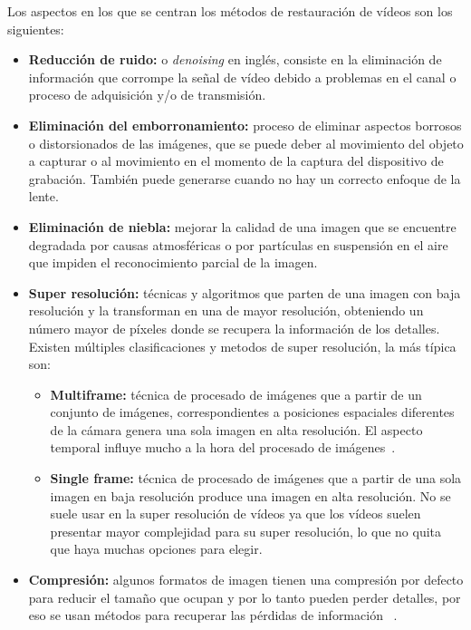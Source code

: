  Los aspectos en los que se centran los métodos de restauración de vídeos son los siguientes:
 \begin{itemize}

    \item \textbf{Reducción de ruido:} o \emph{denoising} en inglés, consiste en la eliminación de información que corrompe la señal de vídeo debido a problemas en el canal o proceso de adquisición y/o de transmisión.
        
    \item \textbf{Eliminación del emborronamiento:} proceso de eliminar aspectos borrosos o distorsionados de las imágenes, que se puede deber al movimiento del objeto a capturar o al movimiento en el momento de la captura del dispositivo de grabación. También puede generarse cuando no hay un correcto enfoque de la lente.
    
    \item \textbf{Eliminación de niebla:} mejorar la calidad de una imagen que se encuentre degradada por causas atmosféricas o por partículas en suspensión en el aire que impiden el reconocimiento parcial de la imagen. ~\cite{inproceedings}

    \item \textbf{Super resolución:} técnicas y algoritmos que parten de una imagen con baja resolución y la transforman en una de mayor resolución, obteniendo un número mayor de píxeles donde se recupera la información de los detalles. Existen múltiples clasificaciones y metodos de super resolución, la más típica son:
        \begin{itemize}
           \item \textbf{Multiframe:} técnica de procesado de imágenes que a partir de un conjunto de imágenes, correspondientes a posiciones espaciales diferentes de la cámara genera una sola imagen en alta resolución. El aspecto temporal influye mucho a la hora del procesado de imágenes~\cite{7919264}.
           
            \item \textbf{Single frame:} técnica de procesado de imágenes que a partir de una sola imagen en baja resolución produce una imagen en alta resolución. No se suele usar en la super resolución de vídeos ya que los vídeos suelen presentar mayor complejidad para su super resolución, lo que no quita que haya muchas opciones para elegir. 
        \end{itemize}
        
     \item \textbf{Compresión:} algunos formatos de imagen tienen una compresión por defecto para reducir el tamaño que ocupan y por lo tanto  pueden perder detalles, por eso se usan métodos para recuperar las pérdidas de información ~\cite{Wang_2016_CVPR}.
     
 \end{itemize}
 
